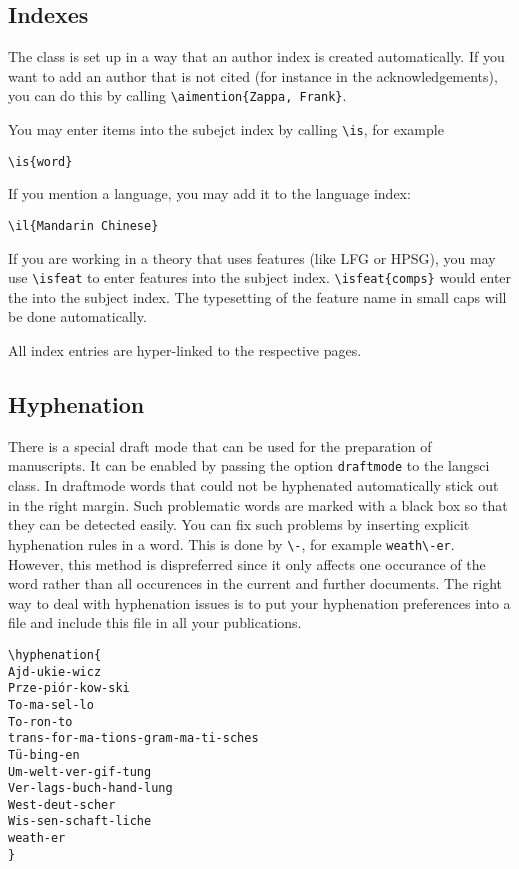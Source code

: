 \subsection{Indexes}

The \lsp class is set up in a way that an author index is created automatically. If you want to add
an author that is not cited (for instance in the acknowledgements), you can do this by calling
\verb+\aimention{Zappa, Frank}+.

You may enter items into the subejct index by calling \verb+\is+, for example 
\begin{verbatim}
\is{word}
\end{verbatim}
If you mention a language, you may add it to the language index: 
\begin{verbatim}
\il{Mandarin Chinese}
\end{verbatim}
If you are working in a theory that uses features (like LFG or HPSG), you may use \verb+\isfeat+ to enter
features into the subject index. \verb+\isfeat{comps}+ would enter the \compsf into the subject
index. The typesetting of the feature name in {\sc small caps} will be done automatically.

All index entries are hyper-linked to the respective pages.

\subsection{Hyphenation}

There is a special draft mode that can be used for the preparation of manuscripts. It can be enabled
by passing the option \texttt{draftmode} to the langsci class. In draftmode words that could not be
hyphenated automatically stick out in the right margin. Such problematic words are marked with a
black box so that they can be detected easily. You can fix such problems by inserting explicit
hyphenation rules in a word. This is done by \verb+\-+, for example \verb+weath\-er+. However, this
method is dispreferred since it only affects one occurance of the word rather than all occurences in
the current and further documents. The right way to deal with hyphenation issues is to put your
hyphenation preferences into a file and include this file in all your publications. 

\begin{verbatim}
\hyphenation{
Ajd-ukie-wicz
Prze-piór-kow-ski
To-ma-sel-lo
To-ron-to
trans-for-ma-tions-gram-ma-ti-sches
Tü-bing-en
Um-welt-ver-gif-tung
Ver-lags-buch-hand-lung
West-deut-scher
Wis-sen-schaft-liche
weath-er
}
\end{verbatim}

